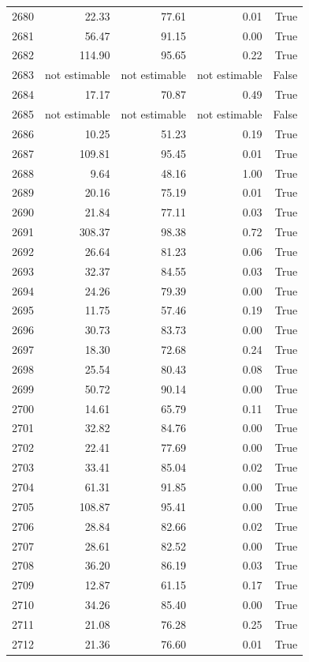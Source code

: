 \begin{longtable}{rrrrr}
2680 & 22.33 & 77.61 & 0.01 & True \\
2681 & 56.47 & 91.15 & 0.00 & True \\
2682 & 114.90 & 95.65 & 0.22 & True \\
2683 & not estimable & not estimable & not estimable & False \\
2684 & 17.17 & 70.87 & 0.49 & True \\
2685 & not estimable & not estimable & not estimable & False \\
2686 & 10.25 & 51.23 & 0.19 & True \\
2687 & 109.81 & 95.45 & 0.01 & True \\
2688 & 9.64 & 48.16 & 1.00 & True \\
2689 & 20.16 & 75.19 & 0.01 & True \\
2690 & 21.84 & 77.11 & 0.03 & True \\
2691 & 308.37 & 98.38 & 0.72 & True \\
2692 & 26.64 & 81.23 & 0.06 & True \\
2693 & 32.37 & 84.55 & 0.03 & True \\
2694 & 24.26 & 79.39 & 0.00 & True \\
2695 & 11.75 & 57.46 & 0.19 & True \\
2696 & 30.73 & 83.73 & 0.00 & True \\
2697 & 18.30 & 72.68 & 0.24 & True \\
2698 & 25.54 & 80.43 & 0.08 & True \\
2699 & 50.72 & 90.14 & 0.00 & True \\
2700 & 14.61 & 65.79 & 0.11 & True \\
2701 & 32.82 & 84.76 & 0.00 & True \\
2702 & 22.41 & 77.69 & 0.00 & True \\
2703 & 33.41 & 85.04 & 0.02 & True \\
2704 & 61.31 & 91.85 & 0.00 & True \\
2705 & 108.87 & 95.41 & 0.00 & True \\
2706 & 28.84 & 82.66 & 0.02 & True \\
2707 & 28.61 & 82.52 & 0.00 & True \\
2708 & 36.20 & 86.19 & 0.03 & True \\
2709 & 12.87 & 61.15 & 0.17 & True \\
2710 & 34.26 & 85.40 & 0.00 & True \\
2711 & 21.08 & 76.28 & 0.25 & True \\
2712 & 21.36 & 76.60 & 0.01 & True \\

\end{longtable}
